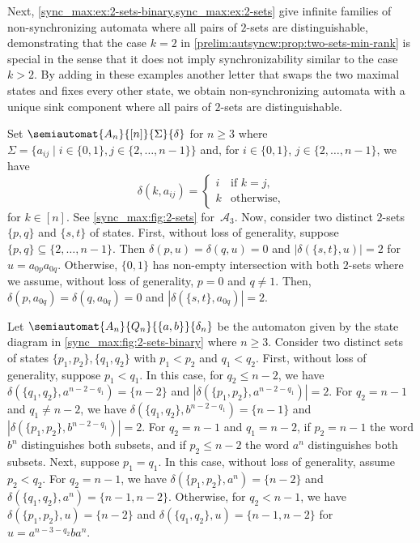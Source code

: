 Next, \cref{sync_max:ex:2-sets-binary,sync_max:ex:2-sets} give infinite families of non-synchronizing automata 
where all pairs of $2$-sets are distinguishable, demonstrating that the case $k = 2$ in
\cref{prelim:autsyncw:prop:two-sets-min-rank} is special in the sense that
it does not imply synchronizability similar to the case $k > 2$.
By adding in these examples another letter that swaps the two maximal states and fixes every other state, we obtain non-synchronizing automata 
with a unique sink component where all pairs of $2$-sets are distinguishable.

\begin{example} 
	\label{sync_max:ex:2-sets}
	Set $\semiautomat{A_n}{[n]}{\Sigma}{\delta}$
	for $n \ge 3$
	where $\Sigma = \{ a_{ij} \mid i \in \{0,1\}, j \in \{2,\ldots,n-1\}\}$
	and, for $i \in \{0,1\}$, $j \in \{2,\ldots,n-1\}$,
	we have
	\[
	\delta(k, a_{ij}) = \begin{cases}
		i & \text{if } k = j, \\
		k & \text{otherwise,}
	\end{cases} 
	\]
	for $k \in [n]$.
	See \cref{sync_max:fig:2-sets}
	for~$\mathcal A_3$.
	Now, consider two distinct $2$-sets $\{p, q\}$
	and $\{s, t\}$ of states. First, without loss of generality,
	suppose $\{p, q\} \subseteq \{2,\ldots,n-1\}$.
	Then $\delta(p, u) = \delta(q, u) = 0$
	and $|\delta(\{s,t\}, u)| = 2$
	for $u = a_{0p} a_{0q}$.
	Otherwise, $\{0,1\}$ has non-empty intersection
	with both $2$-sets where we assume, without loss of 
	generality, $p = 0$ and $q \ne 1$.
	Then,
	$\delta(p, a_{0q}) = \delta(q, a_{0q}) = 0$
	and $|\delta(\{s, t\}, a_{0q})| = 2$.
\end{example}

\begin{example}
	\label{sync_max:ex:2-sets-binary}
	Let $\semiautomat{A_n}{Q_n}{\{a,b\}}{\delta_n}$ be the automaton given by the state diagram in \cref{sync_max:fig:2-sets-binary} where $n \ge 3$. Consider two distinct sets of states  $\{p_1, p_2\}, \{q_1, q_2\}$ with $p_1 < p_2$ and $q_1 < q_2$. %
	First, without loss of generality, suppose $p_1 < q_1$.
	In this case, for $q_2 \le n - 2$, we have $\delta(\{q_1, q_2\}, a^{n - 2 - q_1}) = \{n - 2\}$ 
	and $|\delta(\{p_1, p_2\}, a^{n - 2 - q_1})| = 2$.
	For $q_2 = n - 1$ and $q_1 \ne n - 2$,
	we have $\delta(\{q_1, q_2\}, b^{n - 2 - q_1}) = \{n-1\}$
	and $|\delta(\{p_1, p_2\}, b^{n-2 - q_1})| = 2$.
	For $q_2 = n - 1$ and $q_1 = n - 2$,
	if $p_2 = n - 1$ the word $b^n$ distinguishes both subsets,
	and if $p_2 \le n - 2$ the word $a^n$ distinguishes both subsets.
	Next, suppose $p_1 = q_1$. In this case, without loss of generality,
	assume $p_2 < q_2$. %
	For $q_2 = n - 1$, we have $\delta(\{p_1, p_2\}, a^n) = \{n-2\}$
	and $\delta(\{q_1, q_2\}, a^n) = \{n - 1, n - 2\}$.
	Otherwise, for $q_2 < n - 1$,
	we have $\delta(\{p_1, p_2\}, u) = \{ n - 2 \}$
	and $\delta(\{q_1, q_2\}, u) = \{ n - 1, n - 2\}$
	for $u = a^{n - 3 - q_2}ba^n$. 
\end{example}

